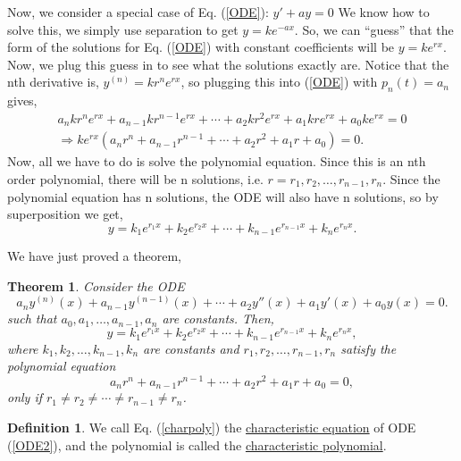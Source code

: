 \documentclass[reqno]{amsart}
\newtheorem{thm}{Theorem}
\theoremstyle{definition}
\newtheorem{definition}{Definition}
\begin{document}
Now, we consider a special case of Eq. (\ref{ODE}): $y' + ay = 0$  We know how to solve this,
we simply use separation to get $y = ke^{-ax}$.  So, we can ``guess'' that the form of the
solutions for Eq. (\ref{ODE}) with constant coefficients will be $y = ke^{rx}$.  Now, we plug
this guess in to see what the solutions exactly are.  Notice that the nth derivative is,
$y^{(n)} = kr^ne^{rx}$, so plugging this into (\ref{ODE}) with $p_n(t) = a_n$ gives,
%
\begin{align*}
a_nkr^ne^{rx} + a_{n-1}kr^{n-1}e^{rx} + \cdots + a_2kr^2e^{rx} + a_1kre^{rx} + a_0ke^{rx} = 0\\
\Rightarrow ke^{rx}\left(a_nr^n + a_{n-1}r^{n-1} + \cdots + a_2r^2 + a_1r + a_0\right) = 0.
\end{align*}
%
Now, all we have to do is solve the polynomial equation.  Since this is an nth order polynomial,
there will be n solutions, i.e. $r = r_1, r_2, \ldots , r_{n-1}, r_n$.  Since the polynomial equation
has n solutions, the ODE will also have n solutions, so by superposition we get,
%
\begin{equation*}
y = k_1e^{r_1x} + k_2e^{r_2x} + \cdots + k_{n-1}e^{r_{n-1}x} + k_ne^{r_nx}.
\end{equation*}


We have just proved a theorem,

\begin{thm}
Consider the ODE
%
\begin{equation}
a_ny^{(n)}(x) + a_{n-1}y^{(n-1)}(x) + \cdots + a_2y''(x) + a_1y'(x) + a_0y(x) = 0.
\label{ODE2}
\end{equation}
%
such that $a_0, a_1, \ldots , a_{n-1}, a_n$ are constants.  Then,
%
\begin{equation}
y = k_1e^{r_1x} + k_2e^{r_2x} + \cdots + k_{n-1}e^{r_{n-1}x} + k_ne^{r_nx},
\end{equation}
%
where $k_1, k_2, \ldots , k_{n-1}, k_n$ are constants and $r_1, r_2, \ldots , r_{n-1}, r_n$
satisfy the polynomial equation
%
\begin{equation}
a_nr^n + a_{n-1}r^{n-1} + \cdots + a_2r^2 + a_1r + a_0 = 0,
\label{charpoly}
\end{equation}
%
only if $r_1 \neq r_2 \neq \cdots \neq r_{n-1} \neq r_n$.
\end{thm}

\begin{definition}
We call Eq. (\ref{charpoly}) the \underline{characteristic equation} of ODE (\ref{ODE2}),
and the polynomial is called the \underline{characteristic polynomial}.
\end{definition}
\end{document}
